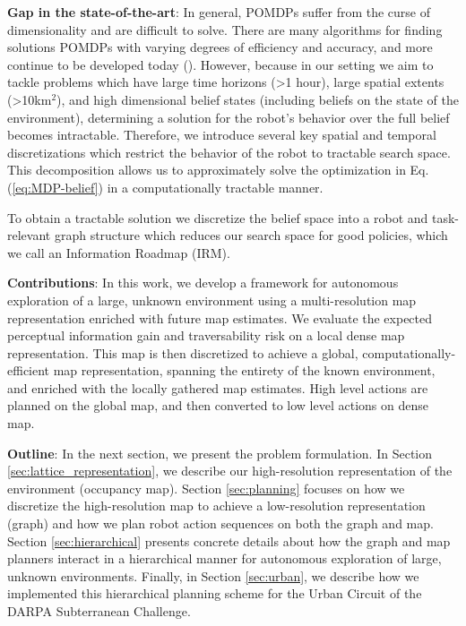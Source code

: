 \documentclass{article}
\newcommand{\ph}[1]{{\textbf{#1}:}} %
\begin{document}
\ph{Gap in the state-of-the-art}
In general, POMDPs suffer from the curse of dimensionality and are difficult to solve.  There are many algorithms for finding solutions POMDPs with varying degrees of efficiency and accuracy, and more continue to be developed today (\cite{silver2010monte,somani2013despot,bonet1998learning,kim2019pomhdp}).  However, because in our setting we aim to tackle problems which have large time horizons (>1 hour), large spatial extents (>10km$^2$), and high dimensional belief states (including beliefs on the state of the environment), determining a solution for the robot's behavior over the full belief becomes intractable.  Therefore, we introduce several key spatial and temporal discretizations which restrict the behavior of the robot to tractable search space.  This decomposition allows us to approximately solve the optimization in Eq. (\ref{eq:MDP-belief}) in a computationally tractable manner.

To obtain a tractable solution we discretize the belief space into a robot and task-relevant graph structure which reduces our search space for good policies, which we call an Information Roadmap (IRM).

\ph{Contributions}
In this work, we develop a framework for autonomous exploration of a large, unknown environment using a multi-resolution map representation enriched with future map estimates. We evaluate the expected perceptual information gain and traversability risk on a local dense map representation. This map is then discretized to achieve a global, computationally-efficient map representation, spanning the entirety of the known environment, and enriched with the locally gathered map estimates. High level actions are planned on the global map, and then converted to low level actions on dense map.    

\ph{Outline}
In the next section, we present the problem formulation. In Section \ref{sec:lattice_representation}, we describe our high-resolution representation of the environment (occupancy map). Section \ref{sec:planning} focuses on how we discretize the high-resolution map to achieve a low-resolution representation (graph) and how we plan robot action sequences on both the graph and map. Section \ref{sec:hierarchical} presents concrete details about how the graph and map planners interact in a hierarchical manner for autonomous exploration of large, unknown environments. Finally, in Section \ref{sec:urban}, we describe how we implemented this hierarchical planning scheme for the Urban Circuit of the DARPA Subterranean Challenge.
\end{document}
